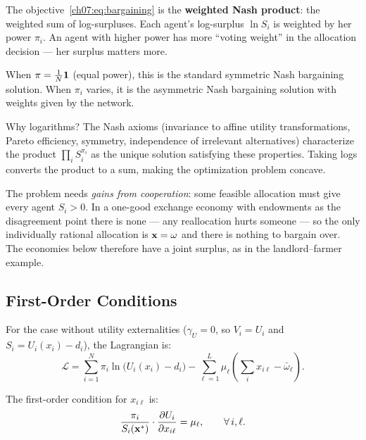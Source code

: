 \documentclass[../structural_economics_book.tex]{subfiles}
\begin{document}
\begin{intuition}
The objective~\eqref{ch07:eq:bargaining} is the \textbf{weighted Nash product}: the weighted sum of log-surpluses. Each agent's log-surplus $\ln S_i$ is weighted by her power $\pi_i$. An agent with higher power has more ``voting weight'' in the allocation decision --- her surplus matters more.

When $\pi = \frac{1}{N}\mathbf{1}$ (equal power), this is the standard symmetric Nash bargaining solution. When $\pi_i$ varies, it is the asymmetric Nash bargaining solution with weights given by the network.

Why logarithms? The Nash axioms (invariance to affine utility transformations, Pareto efficiency, symmetry, independence of irrelevant alternatives) characterize the product $\prod_i S_i^{\pi_i}$ as the unique solution satisfying these properties. Taking logs converts the product to a sum, making the optimization problem concave.

The problem needs \textit{gains from cooperation}: some feasible allocation must give every agent $S_i > 0$. In a one-good exchange economy with endowments as the disagreement point there is none --- any reallocation hurts someone --- so the only individually rational allocation is $\mathbf{x} = \omega$ and there is nothing to bargain over. The economies below therefore have a joint surplus, as in the landlord--farmer example.
\end{intuition}


\subsection{First-Order Conditions}

For the case without utility externalities ($\gamma_U = 0$, so $V_i = U_i$ and $S_i = U_i(x_i) - d_i$), the Lagrangian is:
\begin{equation}
\mathcal{L} = \sum_{i=1}^N \pi_i \ln\bigl(U_i(x_i) - d_i\bigr) - \sum_{\ell=1}^L \mu_\ell \left(\sum_i x_{i\ell} - \bar{\omega}_\ell\right).
\end{equation}

The first-order condition for $x_{i\ell}$ is:
\begin{equation}\label{ch07:eq:foc_bargaining}
\frac{\pi_i}{S_i(\mathbf{x}^*)} \cdot \frac{\partial U_i}{\partial x_{i\ell}} = \mu_\ell, \qquad \forall \, i, \ell.
\end{equation}
\end{document}
